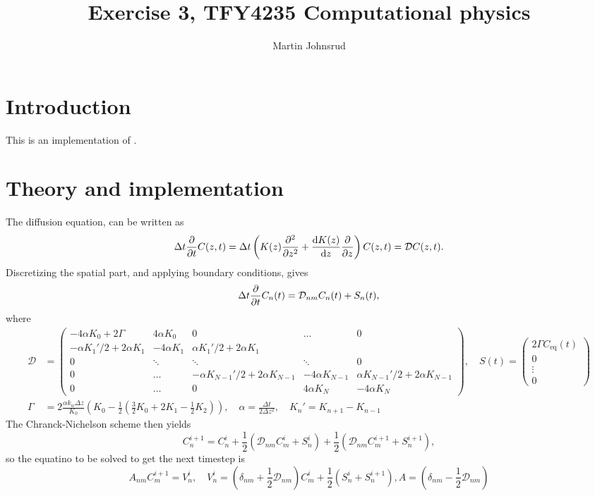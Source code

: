 \documentclass{article}
\title{Exercise 3, TFY4235 Computational physics}
\author{Martin Johnsrud}
\date{}
\begin{document}
    \maketitle
    \section*{Introduction}
        This is an implementation of \cite{exercise}.
    \section*{Theory and implementation}
    The diffusion equation, can be written as
    \begin{equation*}
        \Delta t \pdv{t} C(z, t) = \Delta t \left(K(z) \pdv[2]{z} + \dv{K(z)}{z}\pdv{z}\right) C(z, t) = \mathcal{D} C(z, t).
    \end{equation*}
    Discretizing the spatial part, and applying boundary conditions, gives
    \begin{equation*}
        \Delta t \pdv{t} C_n(t) = \mathcal{D}_{nm} C_n(t) + S_n(t),
    \end{equation*}
    where 
    \begin{align*}
        \mathcal{D} &=
        \begin{pmatrix}
            -4\alpha K_0 + 2\Gamma & 4\alpha K_0 & 0 & \dots&0 \\
            -\alpha K_1'/2 + 2\alpha K_1 & -4 \alpha K_1 & \alpha K_1'/2 + 2\alpha K_1 \\
            0 & \ddots & \ddots & \ddots & 0\\
            0 & \dots &-\alpha K_{N-1}'/2 + 2\alpha K_{N-1} & -4 \alpha K_{N-1} & \alpha K_{N-1}'/2 + 2\alpha K_{N-1} \\
             0 & \dots & 0 & 4\alpha K_N & -4\alpha K_N
        \end{pmatrix},\quad
        S(t) = 
        \begin{pmatrix}
            2\Gamma C_\mathrm{eq}(t) \\
            0\\
            \vdots \\
            0
        \end{pmatrix} \\
    \Gamma &= 2 \frac{\alpha k_w \Delta z}{K_0} \left(K_0 - \frac{1}{2}(\frac{3}{2} K_0 + 2K_1 - \frac{1}{2}K_2)\right), \quad
     \alpha = \frac{\Delta t}{2 \Delta z^2 }, \quad
      K_n' = K_{n+1} - K_{n-1}
    \end{align*}
    The Chranck-Nichelson scheme then yields
    \begin{equation*}
        C_n^{i+1}  = C_n^i + \frac{1}{2} (\mathcal{D}_{nm} C_m^i + S_n^i) + \frac{1}{2} (\mathcal{D}_{nm} C_m^{i+1} + S_n^{i+1}),
    \end{equation*}
    so the equatino to be solved to get the next timestep is
    \begin{equation*}
        A_{nm} C_{m}^{i+1} = V_n^i, \quad V_n^i = \left(\delta_{nm} + \frac{1}{2} \mathcal{D}_{nm}\right) C_m^i + \frac{1}{2}(S_n^i + S_n^{i+1}), A = \left(\delta_{nm} - \frac{1}{2} \mathcal{D}_{nm}\right)
    \end{equation*}
    
    
\end{document}
